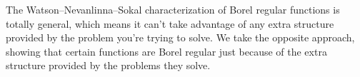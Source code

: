 \documentclass{article}
\let\Re\relax
\DeclareMathOperator{\Re}{Re}
\newcommand{\C}{\mathbb{C}}
\newcommand{\series}[1]{\tilde{#1}}
\newcommand*{\defeq}{\mathrel{\vcenter{\baselineskip0.5ex \lineskiplimit0pt
                     \hbox{\scriptsize.}\hbox{\scriptsize.}}}%
                     =}
\newcommand{\borel}{\mathcal{B}}
\theoremstyle{definition}
\theoremstyle{plain}
\begin{document}
\begin{center}
\end{center}

The Watson--Nevanlinna--Sokal characterization of Borel regular functions is totally general, which means it can't take advantage of any extra structure provided by the problem you're trying to solve. We take the opposite approach, showing that certain functions are Borel regular just because of the extra structure provided by the problems they solve. 

\end{document}
